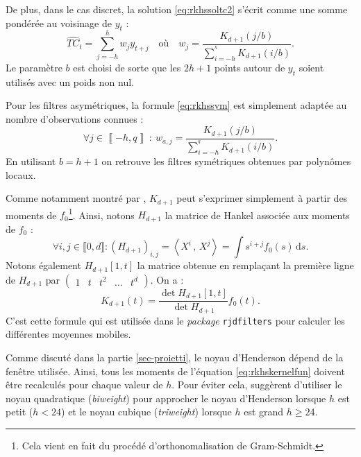 \documentclass[
  12pt,
  french,
  12pt,a4paper]{article}
\newcommand\1{\mathds{1}}
\newcommand\ud{\,\mathrm{d}}
\newcommand{\ps}[2]{\left\langle #1 \,,\, #2 \right\rangle}
\begin{document}
De plus, dans le cas discret, la solution \eqref{eq:rkhssoltc2} s'écrit comme une somme pondérée au voisinage de \(y_t\) :
\begin{equation}
\widehat{TC}_t=\sum_{j=-h}^h w_j y_{t+j}\quad
\text{où} \quad
w_j=\frac{K_{d+1}(j/b)}{\sum_{i=-h}^{^h}K_{d+1}(i/b)}.
\label{eq:rkhssym}
\end{equation}
Le paramètre \(b\) est choisi de sorte que les \(2h+1\) points autour de \(y_t\) soient utilisés avec un poids non nul.

Pour les filtres asymétriques, la formule \eqref{eq:rkhssym} est simplement adaptée au nombre d'observations connues :
\begin{equation}
\forall j\in\left\llbracket -h,q\right\rrbracket\::\: w_{a,j}=\frac{K_{d+1}(j/b)}{\sum_{i=-h}^{^q}K_{d+1}(i/b)}.
\label{eq:rkhsasym}
\end{equation}
En utilisant \(b=h+1\) on retrouve les filtres symétriques obtenues par polynômes locaux.

Comme notamment montré par \textcite{dagumbianconcini2016seasonal}, \(K_{d+1}\) peut s'exprimer simplement à partir des moments de \(f_0\)\footnote{
  Cela vient en fait du procédé d'orthonomalisation de Gram-Schmidt.}.
Ainsi, notons \(H_{d+1}\) la matrice de Hankel associée aux moments de \(f_0\) :
\[
\forall i,j\in \llbracket 0, d\rrbracket:
\left(H_{d+1}\right)_{i,j}=\ps{X^i}{X^j}=\int s^{i+j}f_0(s)\ud s.
\]
Notons également \(H_{d+1}[1,t]\) la matrice obtenue en remplaçant la première ligne de \(H_{d+1}\) par \(\begin{pmatrix} 1 & t & t^2 & \dots & t^d\end{pmatrix}\).
On a :
\begin{equation}
K_{d+1}(t)=\frac{\det{H_{d+1}[1,t]}}{\det{H_{d+1}}}f_0(t).
\label{eq:rkhskernelfun}
\end{equation}
C'est cette formule qui est utilisée dans le \emph{package} \texttt{rjdfilters} pour calculer les différentes moyennes mobiles.

Comme discuté dans la partie \ref{sec-proietti}, le noyau d'Henderson dépend de la fenêtre utilisée.
Ainsi, tous les moments de l'équation \eqref{eq:rkhskernelfun} doivent être recalculés pour chaque valeur de \(h\).
Pour éviter cela, \textcite{dagumbianconcini2008} suggèrent d'utiliser le noyau quadratique (\emph{biweight}) pour approcher le noyau d'Henderson lorsque \(h\) est petit (\(h< 24\)) et le noyau cubique (\emph{triweight}) lorsque \(h\) est grand \(h\geq 24\).
\end{document}
